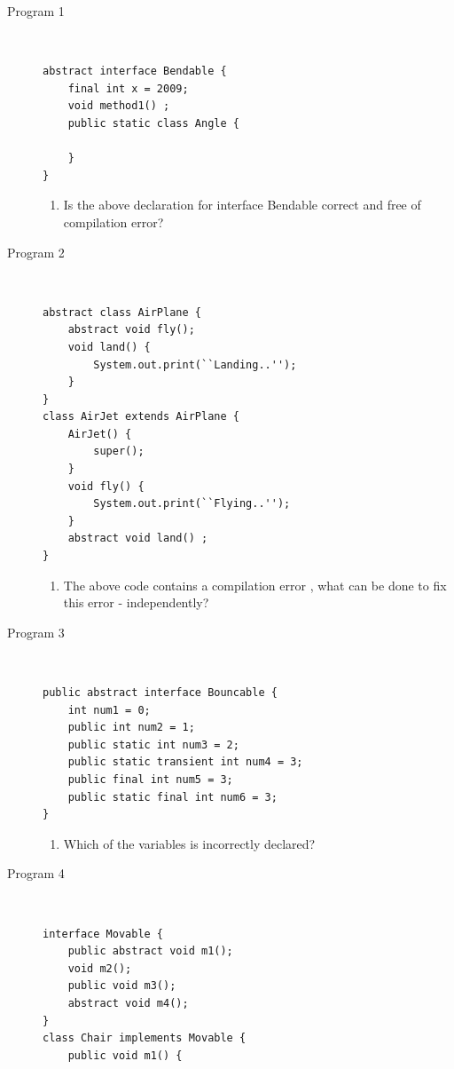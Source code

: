 \documentclass[11pt,a4paper]{article}
\def\AnswerBox{\fbox{\begin{minipage}{4in}\hfill\vspace{0.5in}\end{minipage}}}
\begin{document}
\begin{description}
\item [Program 1] \
\begin{lstlisting}
abstract interface Bendable {
    final int x = 2009; 
    void method1() ; 
    public static class Angle {

    }
}
\end{lstlisting}

\AnswerBox

\begin{enumerate}[label=\bfseries Q\arabic*:]\itemsep10pt
\item Is the above declaration for interface Bendable correct and free of compilation error?
\end{enumerate}

\item [Program 2] \
\begin{lstlisting}
abstract class AirPlane { 
    abstract void fly(); 
    void land() {
        System.out.print(``Landing..'');
    }
}
class AirJet extends AirPlane { 
    AirJet() {
        super(); 
    }
    void fly() {
        System.out.print(``Flying..'');
    }
    abstract void land() ;
}
\end{lstlisting}

\AnswerBox

\begin{enumerate}[label=\bfseries Q\arabic*:]\itemsep10pt
\item The above code contains a compilation error , what can be done to fix this error - independently?
\end{enumerate}

\item [Program 3] \
\begin{lstlisting}
public abstract interface Bouncable {
    int num1 = 0;
    public int num2 = 1;
    public static int num3 = 2;
    public static transient int num4 = 3;
    public final int num5 = 3;
    public static final int num6 = 3;
}
\end{lstlisting}

\AnswerBox

\begin{enumerate}[label=\bfseries Q\arabic*:]\itemsep10pt
\item Which of the variables is incorrectly declared?
\end{enumerate}

\item [Program 4] \
\begin{lstlisting}
interface Movable {
    public abstract void m1(); 
    void m2();
    public void m3(); 
    abstract void m4(); 
}
class Chair implements Movable { 
    public void m1() {
    

\end{lstlisting}
\end{description}
\end{document}
